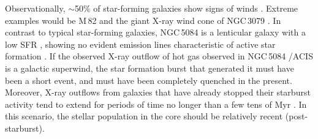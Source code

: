 \documentclass[modern]{CORE-AAS/aastex631}
\begin{document}
{Observationally, $\sim$50\% of star-forming galaxies show signs of winds \citep[][]{rubin+2014apj794_156}. Extreme examples would be M\,82 \citep{shopbell+1998apj493_129,heckman+2017incollection_2431} and the giant X-ray wind cone of NGC\,3079 \citep[$R\sim3$ arcmin, 16.3~kpc,][]{hodgeskluck+2020apj903_35}. In contrast to typical star-forming galaxies, NGC\,5084 is a lenticular galaxy with a low SFR \citep[$0.128\pm0.016$ M$_{\odot}$ yr$^{-1}$,][]{osullivan+2018aap618_126}, showing no evident emission lines characteristic of active star formation \citep[][see Fig.\,\ref{fig:NGC5084_optical_spectra}]{moustakas+2006apj164_81}. If the observed X-ray outflow of hot gas observed in NGC\,5084 \Chandra/ACIS is a galactic superwind, the star formation burst that generated it must have been a short event, and must have been completely quenched in the present. Moreover, X-ray outflows from galaxies that have already stopped their starburst activity tend to extend for periods of time no longer than a few tens of Myr \citep{mcquinn+2018mnras477_3164}.  In this scenario, the stellar population in the core should be relatively recent (post-starburst).


}
\end{document}
